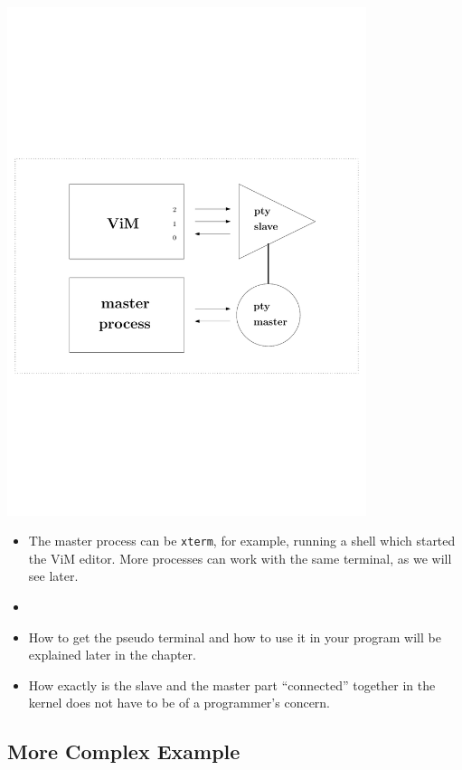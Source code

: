 \begin{center}
\includegraphics[width=105mm]{img/terminals/working-with-pty.pdf}
\end{center}

\begin{itemize}
\item The master process can be \texttt{xterm}, for example, running a shell
which started the ViM editor. More processes can work with the same terminal, as
we will see later.
\item {}
\item How to get the pseudo terminal and how to use it in your program will be
explained later in the chapter.
\item How exactly is the slave and the master part ``connected'' together in the
kernel does not have to be of a programmer's concern.
\end{itemize}

\subsection{More Complex Example}

